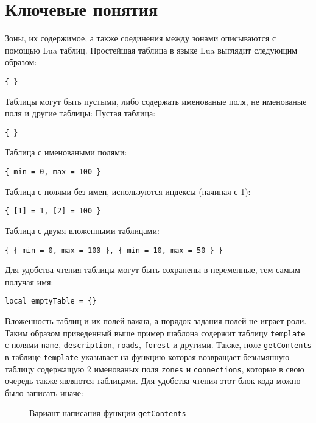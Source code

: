 \section{Ключевые понятия}
Зоны, их содержимое, а также соединения между зонами описываются с помощью Lua таблиц.
Простейшая таблица в языке Lua выглядит следующим образом:\\
\begin{lstlisting}
{ }
\end{lstlisting}
Таблицы могут быть пустыми, либо содержать именованые поля, не именованые поля и другие таблицы:
Пустая таблица:\\
\begin{lstlisting}
{ }
\end{lstlisting}
Таблица с именоваными полями:\\
\begin{lstlisting}
{ min = 0, max = 100 }
\end{lstlisting}
Таблица с полями без имен, используются индексы (начиная с 1):\\
\begin{lstlisting}
{ [1] = 1, [2] = 100 }
\end{lstlisting}
Таблица с двумя вложенными таблицами:\\
\begin{lstlisting}
{ { min = 0, max = 100 }, { min = 10, max = 50 } }
\end{lstlisting}
Для удобства чтения таблицы могут быть сохранены в переменные, тем самым получая имя:
\begin{lstlisting}
local emptyTable = {}
\end{lstlisting}


Вложенность таблиц и их полей важна, а порядок задания полей не играет роли.\\
Таким образом приведенный выше пример шаблона содержит таблицу \texttt{template} с полями
\texttt{name}, \texttt{description}, \texttt{roads}, \texttt{forest} и другими.
Также, поле \texttt{getContents} в таблице \texttt{template} указывает на функцию которая возвращает безымянную таблицу 
содержащую 2 именованых поля \texttt{zones} и \texttt{connections}, которые в свою очередь также являются таблицами.
Для удобства чтения этот блок кода можно было записать иначе:
\begin{figure}[h]

\caption{Вариант написания функции \texttt{getContents}}
\end{figure}

\newpage

\newpage

\newpage

